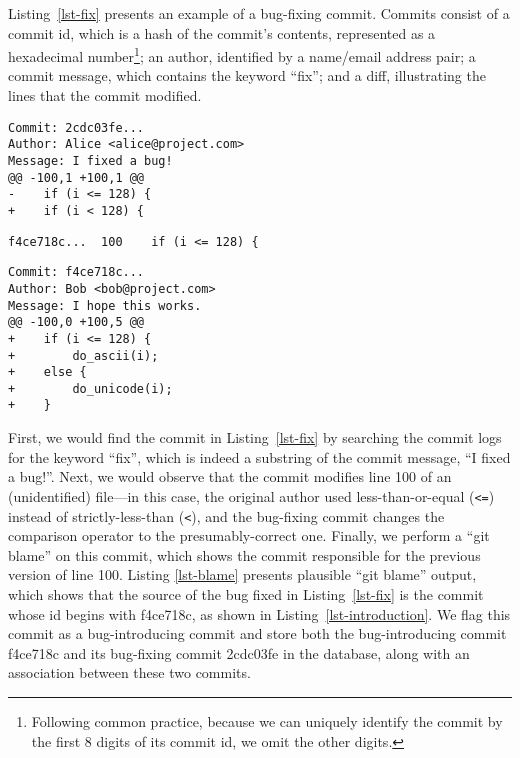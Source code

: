 Listing~\ref{lst-fix} presents an example of a bug-fixing commit. Commits
consist of a commit id, which is a hash of the commit's contents, represented as
a hexadecimal number\footnote{Following common practice, because we can uniquely
  identify the commit by the first 8 digits of its commit id, we omit the other
  digits.}; an author, identified by a name/email address pair; a commit
message, which contains the keyword ``fix''; and a diff, illustrating the lines
that the commit modified.


\begin{lstlisting}[caption=An example bug-fixing commit, label=lst-fix,
                   frame=single, captionpos=b, basicstyle=\small]
Commit: 2cdc03fe...
Author: Alice <alice@project.com>
Message: I fixed a bug!
@@ -100,1 +100,1 @@
-    if (i <= 128) {
+    if (i < 128) {
\end{lstlisting}

\begin{lstlisting}[caption={\tt git blame} output for the bug-fixing commit,
                   label=lst-blame, frame=single, captionpos=b, basicstyle=\small]
f4ce718c...  100    if (i <= 128) {
\end{lstlisting}

\begin{lstlisting}[caption=Associated bug-introducing commit for the example,
                   label=lst-introduction, frame=single, captionpos=b, basicstyle=\small]
Commit: f4ce718c...
Author: Bob <bob@project.com>
Message: I hope this works.
@@ -100,0 +100,5 @@
+    if (i <= 128) {
+        do_ascii(i);
+    else {
+        do_unicode(i);
+    }
\end{lstlisting}

First, we would find the commit in Listing~\ref{lst-fix} by searching the commit
logs for the keyword ``fix'', which is indeed a substring of the commit message,
``I fixed a bug!''.  Next, we would observe that the commit modifies line 100 of
an (unidentified) file---in this case, the original author used
less-than-or-equal (\verb+<=+) instead of strictly-less-than (\verb+<+), and the
bug-fixing commit changes the comparison operator to the presumably-correct one.
Finally, we perform a ``git blame'' on this commit, which shows the commit
responsible for the previous version of line 100. Listing \ref{lst-blame}
presents plausible ``git blame'' output, which shows that the source of the bug
fixed in Listing~\ref{lst-fix} is the commit whose id begins with f4ce718c, as
shown in Listing~\ref{lst-introduction}. We flag this commit as a
bug-introducing commit and store both the bug-introducing commit f4ce718c and
its bug-fixing commit 2cdc03fe in the database, along with an association
between these two commits.

